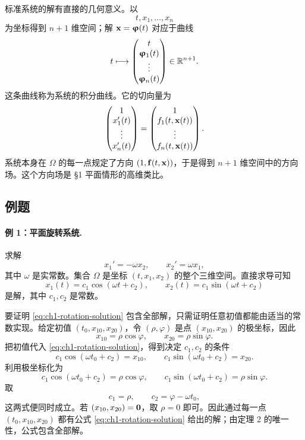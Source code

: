 标准系统的解有直接的几何意义。以
\[
 t,x_1,\ldots,x_n
\]
为坐标得到 \(n+1\) 维空间；解 \(\vect{x}=\vect{\varphi}(t)\) 对应于曲线
\begin{equation}
 t\longmapsto
 \begin{pmatrix}
  t\\
  \bm{\upvarphi}_1(t)\\
  \vdots\\
  \bm{\upvarphi}_n(t)
 \end{pmatrix}
 \in\mathbb R^{n+1}.
 \label{eq:ch1-integral-curve-system}
\end{equation}
这条曲线称为系统的积分曲线。它的切向量为
\[
 \begin{pmatrix}
  1\\
  x_1'(t)\\
  \vdots\\
  x_n'(t)
 \end{pmatrix}
 =
 \begin{pmatrix}
  1\\
  f_1(t,\vect{x}(t))\\
  \vdots\\
  f_n(t,\vect{x}(t))
 \end{pmatrix}.
\]
系统本身在 \(\Omega\) 的每一点规定了方向 \((1,\vect{f}(t,\vect{x}))\)，于是得到 \(n+1\) 维空间中的方向场。这个方向场是 §1 平面情形的高维类比。

\subsection{例题}

\paragraph{例 1：平面旋转系统.}
求解
\begin{equation}
 x_1'=-\omega x_2,
 \qquad
 x_2'=\omega x_1,
 \label{eq:ch1-rotation}
\end{equation}
其中 \(\omega\) 是实常数。集合 \(\Omega\) 是坐标 \((t,x_1,x_2)\) 的整个三维空间。直接求导可知
\begin{equation}
 x_1(t)=c_1\cos(\omega t+c_2),
 \qquad
 x_2(t)=c_1\sin(\omega t+c_2)
 \label{eq:ch1-rotation-solution}
\end{equation}
是解，其中 \(c_1,c_2\) 是常数。

要证明 \eqref{eq:ch1-rotation-solution} 包含全部解，只需证明任意初值都能由适当的常数实现。给定初值 \((t_0,x_{10},x_{20})\)，令 \((\rho,\varphi)\) 是点 \((x_{10},x_{20})\) 的极坐标，因此
\[
 x_{10}=\rho\cos\varphi,
 \qquad
 x_{20}=\rho\sin\varphi.
\]
把初值代入 \eqref{eq:ch1-rotation-solution}，得到决定 \(c_1,c_2\) 的条件
\[
 c_1\cos(\omega t_0+c_2)=x_{10},
 \qquad
 c_1\sin(\omega t_0+c_2)=x_{20}.
\]
利用极坐标化为
\[
 c_1\cos(\omega t_0+c_2)=\rho\cos\varphi,
 \qquad
 c_1\sin(\omega t_0+c_2)=\rho\sin\varphi.
\]
取
\[
 c_1=\rho,
 \qquad
 c_2=\varphi-\omega t_0,
\]
这两式便同时成立。若 \((x_{10},x_{20})=\vect{0}\)，取 \(\rho=0\) 即可。因此通过每一点 \((t_0,x_{10},x_{20})\) 都有公式 \eqref{eq:ch1-rotation-solution} 给出的解；由定理 2 的唯一性，公式包含全部解。

